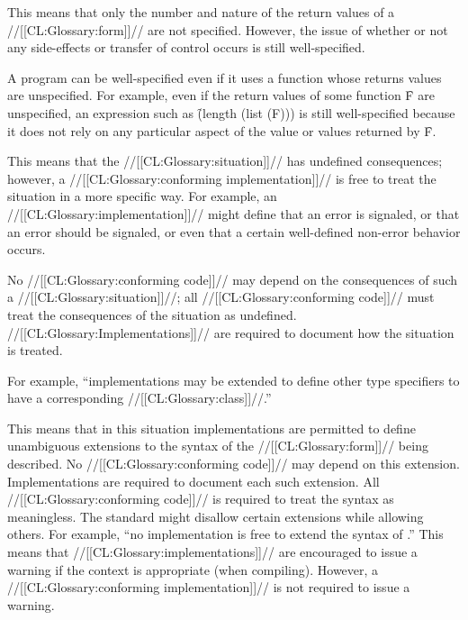 This means that only the number and nature of the return values of a //[[CL:Glossary:form]]// are not specified.  However, the issue of whether or not any side-effects or transfer of control occurs is still well-specified.

A program can be well-specified even if it uses a function whose returns values are unspecified.  For example, even if the return values of some function \f{F} are unspecified, an expression such as \f{(length (list (F)))} is still well-specified because it does not rely on any particular aspect of the value or values returned by \f{F}.


This means that the //[[CL:Glossary:situation]]// has undefined consequences; however, a //[[CL:Glossary:conforming implementation]]// is free to treat the situation in a more specific way.   For example, an //[[CL:Glossary:implementation]]// might define 
    that      an error is signaled,
 or that      an error should be signaled,
 or even that a certain well-defined non-error behavior occurs.

No //[[CL:Glossary:conforming code]]// may depend on the consequences of such a //[[CL:Glossary:situation]]//; all //[[CL:Glossary:conforming code]]// must treat the consequences of the situation as undefined. //[[CL:Glossary:Implementations]]// are required to document how the situation is treated.

For example, ``implementations may be extended to define other type specifiers to have a corresponding //[[CL:Glossary:class]]//.''


This means that in this situation implementations are permitted to define unambiguous extensions to the syntax of the //[[CL:Glossary:form]]// being described.  No //[[CL:Glossary:conforming code]]// may depend on this extension. Implementations are required to document each such extension. All //[[CL:Glossary:conforming code]]// is required to treat the syntax as meaningless. The standard might disallow certain extensions while allowing others. For example, ``no implementation is free to extend the syntax of .''
          This means that //[[CL:Glossary:implementations]]// are encouraged to issue a warning if the context is appropriate (\eg when compiling).  However, a //[[CL:Glossary:conforming implementation]]// is not required to issue a warning.

